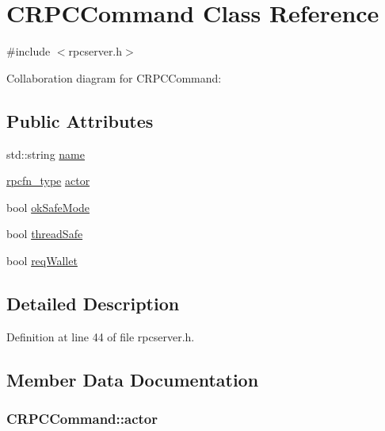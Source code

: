 \hypertarget{class_c_r_p_c_command}{}\section{C\+R\+P\+C\+Command Class Reference}
\label{class_c_r_p_c_command}


{\ttfamily \#include $<$rpcserver.\+h$>$}



Collaboration diagram for C\+R\+P\+C\+Command\+:
\subsection*{Public Attributes}
\begin{DoxyCompactItemize}
\item 
std\+::string \hyperlink{class_c_r_p_c_command_a8da584c0d2d98be22ebff74d3cf2221c}{name}
\item 
\hyperlink{rpcserver_8h_a55410ecf7b981d238edda579f8c97040}{rpcfn\+\_\+type} \hyperlink{class_c_r_p_c_command_a197a7eba565b4d9673537655fcbc1344}{actor}
\item 
bool \hyperlink{class_c_r_p_c_command_a7f0b10e619917a3019f36ba5fa538adb}{ok\+Safe\+Mode}
\item 
bool \hyperlink{class_c_r_p_c_command_a0377f0b0f803b3698121f3a2b35d67b1}{thread\+Safe}
\item 
bool \hyperlink{class_c_r_p_c_command_a15bd6eb3af57f6382f15b2e927fdd445}{req\+Wallet}
\end{DoxyCompactItemize}


\subsection{Detailed Description}


Definition at line 44 of file rpcserver.\+h.



\subsection{Member Data Documentation}
\hypertarget{class_c_r_p_c_command_a197a7eba565b4d9673537655fcbc1344}{}
\subsubsection[{actor}]{ C\+R\+P\+C\+Command\+::actor}\label{class_c_r_p_c_command_a197a7eba565b4d9673537655fcbc1344}


